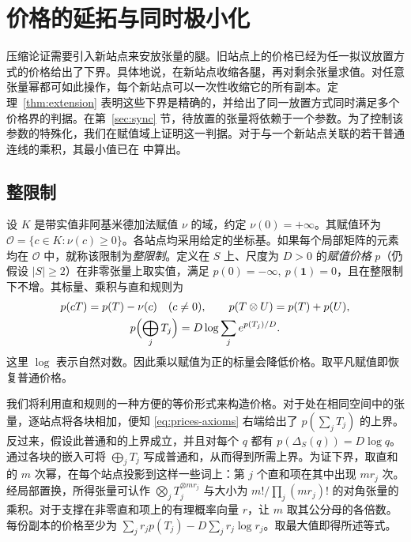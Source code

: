 \section{价格的延拓与同时极小化}\label{sec:prices}

压缩论证需要引入新站点来安放张量的腿。旧站点上的价格已经为任一拟议放置方式的价格给出了下界。具体地说，在新站点收缩各腿，再对剩余张量求值。对任意张量幂都可如此操作，每个新站点可以一次性收缩它的所有副本。定理~\ref{thm:extension} 表明这些下界是精确的，并给出了同一放置方式同时满足多个价格界的判据。在第~\ref{sec:sync} 节，待放置的张量将依赖于一个参数。为了控制该参数的特殊化，我们在赋值域上证明这一判据。对于与一个新站点关联的若干普通连线的乘积，其最小值已在 \cite[Theorem~]{oaG} 中算出。

\subsection{整限制}
设 \(K\) 是带实值非阿基米德加法赋值 \(\nu\) 的域，约定 \(\nu(0)=+\infty\)。其赋值环为 \(\mathcal O=\{c\in K:\nu(c)\ge0\}\)。各站点均采用给定的坐标基。如果每个局部矩阵的元素均在 \(\mathcal O\) 中，就称该限制为\emph{整限制}。定义在 \(S\) 上、尺度为 \(D>0\) 的\emph{赋值价格} \(p\)（仍假设 $|S|\ge2$）在非零张量上取实值，满足 \(p(0)=-\infty,\ p(\mathbf1)=0\)，且在整限制下不增。其标量、乘积与直和规则为
\begin{equation}\label{eq:prices-axioms}
 \begin{gathered}
 p(cT)=p(T)-\nu(c) \quad(c\ne0), \qquad
 p(T\otimes U)=p(T)+p(U),\\
 p\Bigl(\bigoplus_j T_j\Bigr)=D\log\sum_j e^{p(T_j)/D}.
 \end{gathered}
\end{equation}
这里 \(\log\) 表示自然对数。因此乘以赋值为正的标量会降低价格。取平凡赋值即恢复普通价格。

我们将利用直和规则的一种方便的等价形式来构造价格。对于处在相同空间中的张量，逐站点将各块相加，便知 \eqref{eq:prices-axioms} 右端给出了 \(p(\sum_j T_j)\) 的上界。反过来，假设此普通和的上界成立，并且对每个 \(q\) 都有 \(p(\Delta_S(q))=D\log q\)。通过各块的嵌入可将 \(\bigoplus_j T_j\) 写成普通和，从而得到所需上界。为证下界，取直和的 \(m\) 次幂，在每个站点投影到这样一些词上：第 \(j\) 个直和项在其中出现 \(m r_j\) 次。经局部置换，所得张量可认作 \(\bigotimes_jT_j^{\otimes m r_j}\) 与大小为 \(m!/\prod_j(mr_j)!\) 的对角张量的乘积。对于支撑在非零直和项上的有理概率向量 \(r\)，让 \(m\) 取其公分母的各倍数。每份副本的价格至少为 \(\sum_jr_jp(T_j)-D\sum_j r_j\log r_j\)。取最大值即得所述等式。

